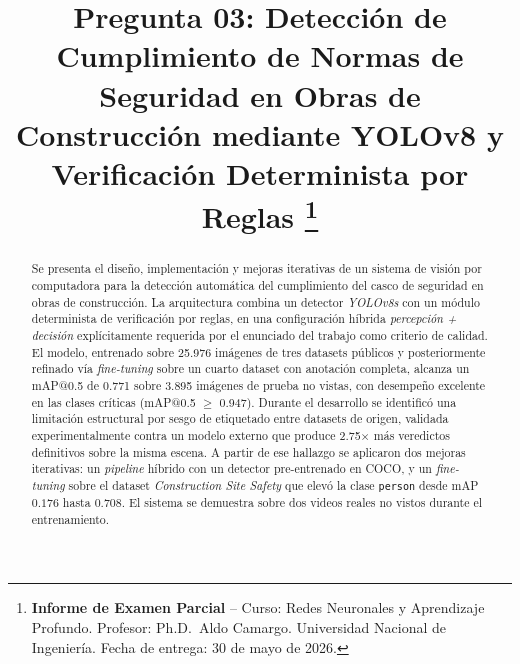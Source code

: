 \documentclass[conference]{IEEEtran}
\begin{document}
\title{Pregunta 03: Detección de Cumplimiento de Normas de Seguridad
en Obras de Construcción mediante YOLOv8 y Verificación Determinista
por Reglas%
\thanks{\textbf{Informe de Examen Parcial} -- Curso: Redes Neuronales y
Aprendizaje Profundo. Profesor: Ph.D.~Aldo Camargo. Universidad Nacional
de Ingeniería. Fecha de entrega: 30 de mayo de 2026.}}

\author{
    \and
    \and
}

\maketitle

\begin{abstract}
Se presenta el diseño, implementación y mejoras iterativas de un
sistema de visión por computadora para la detección automática del
cumplimiento del casco de seguridad en obras de construcción. La
arquitectura combina un detector \textit{YOLOv8s} con un módulo
determinista de verificación por reglas, en una configuración
híbrida \emph{percepción + decisión} explícitamente requerida por el
enunciado del trabajo como criterio de calidad. El modelo, entrenado
sobre 25.976 imágenes de tres datasets públicos y posteriormente
refinado vía \textit{fine-tuning} sobre un cuarto dataset con
anotación completa, alcanza un mAP@0.5 de 0.771 sobre 3.895
imágenes de prueba no vistas, con desempeño excelente en las clases
críticas (mAP@0.5 $\geq$ 0.947). Durante el desarrollo se
identificó una limitación estructural por sesgo de etiquetado entre
datasets de origen, validada experimentalmente contra un modelo
externo que produce 2.75$\times$ más veredictos definitivos sobre la
misma escena. A partir de ese hallazgo se aplicaron dos mejoras
iterativas: un \textit{pipeline} híbrido con un detector
pre-entrenado en COCO, y un \textit{fine-tuning} sobre el dataset
\emph{Construction Site Safety} que elevó la clase \texttt{person}
desde mAP $0.176$ hasta $0.708$. El sistema se demuestra sobre dos
videos reales no vistos durante el entrenamiento.
\end{abstract}
\end{document}
